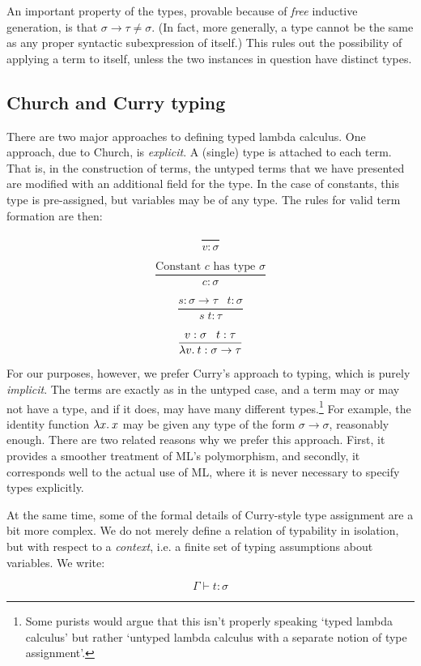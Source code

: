 An important property of the types, provable because of {\em free} inductive
generation, is that $\sigma \to \tau \not= \sigma$. (In fact, more generally,
a type cannot be the same as any proper syntactic subexpression of itself.)
This rules out the possibility of applying a term to itself, unless the two
instances in question have distinct types.

\subsection{Church and Curry typing}

There are two major approaches to defining typed lambda calculus. One approach,
due to Church, is {\em explicit}. A (single) type is attached to each term.
That is, in the construction of terms, the untyped terms that we have presented
are modified with an additional field for the type. In the case of constants,
this type is pre-assigned, but variables may be of any type. The rules for
valid term formation are then:

$$ \frac{}{v:\sigma} $$

$$ \frac{\mbox{Constant $c$ has type $\sigma$}}{c:\sigma} $$

$$ \frac{s:\sigma \to \tau \;\;\; t:\sigma}{s\; t : \tau} $$

$$ \frac{v:\sigma \;\;\; t:\tau}{\lambda v.\: t : \sigma \to \tau} $$

For our purposes, however, we prefer Curry's approach to typing, which is
purely {\em implicit}. The terms are exactly as in the untyped case, and a term
may or may not have a type, and if it does, may have many different
types.\footnote{Some purists would argue that this isn't properly speaking
`typed lambda calculus' but rather `untyped lambda calculus with a separate
notion of type assignment'.} For example, the identity function $\lambda x.\: x$
may be given any type of the form $\sigma \to \sigma$, reasonably enough. There
are two related reasons why we prefer this approach. First, it provides a
smoother treatment of ML's polymorphism, and secondly, it corresponds well to
the actual use of ML, where it is never necessary to specify types explicitly.

At the same time, some of the formal details of Curry-style type assignment are
a bit more complex. We do not merely define a relation of typability in
isolation, but with respect to a {\em context}, i.e. a finite set of typing
assumptions about variables. We write:

$$ \Gamma \vdash t : \sigma $$

